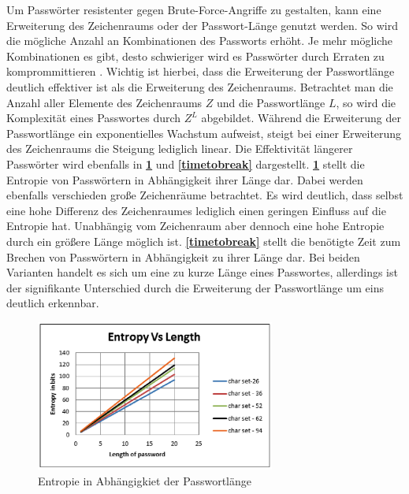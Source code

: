     Um Passwörter resistenter gegen Brute-Force-Angriffe zu gestalten, kann eine Erweiterung des Zeichenraums oder der Passwort-Länge genutzt werden. So wird die mögliche Anzahl an Kombinationen des Passworts erhöht. Je mehr mögliche Kombinationen es gibt, desto schwieriger wird es Passwörter durch Erraten zu komprommittieren \cite{chanda2016password}. Wichtig ist hierbei, dass die Erweiterung der Passwortlänge deutlich effektiver ist als die Erweiterung des Zeichenraums. Betrachtet man die Anzahl aller Elemente des Zeichenraums $Z$ und die Passwortlänge $L$, so wird die Komplexität eines Passwortes durch $Z^L$ abgebildet. Während die Erweiterung der Passwortlänge ein exponentielles Wachstum aufweist, steigt bei einer Erweiterung des Zeichenraums die Steigung lediglich linear. Die Effektivität längerer Passwörter wird ebenfalls in \textbf{\ref{EntropyvsLength}} und \textbf{\ref{timetobreak}} dargestellt. \textbf{\ref{EntropyvsLength}} stellt die Entropie von Passwörtern in Abhängigkeit ihrer Länge dar. Dabei werden ebenfalls verschieden große Zeichenräume betrachtet. Es wird deutlich, dass selbst eine hohe Differenz des Zeichenraumes lediglich einen geringen Einfluss auf die Entropie hat. Unabhängig vom Zeichenraum aber dennoch eine hohe Entropie durch ein größere Länge möglich ist. \textbf{\ref{timetobreak}} stellt die benötigte Zeit zum Brechen von Passwörtern in Abhängigkeit zu ihrer Länge dar. Bei beiden Varianten handelt es sich um eine zu kurze Länge eines Passwortes, allerdings ist der signifikante Unterschied durch die Erweiterung der Passwortlänge um eins deutlich erkennbar.

    \begin{figure}[h]
        \centering 
        \includegraphics[width=0.7\textwidth]{img/abbildungen/entropy-length.png}
        \captionsetup{format=hang}
        \caption{Entropie in Abhängigkiet der Passwortlänge} \label{EntropyvsLength}
    \end{figure}
    
